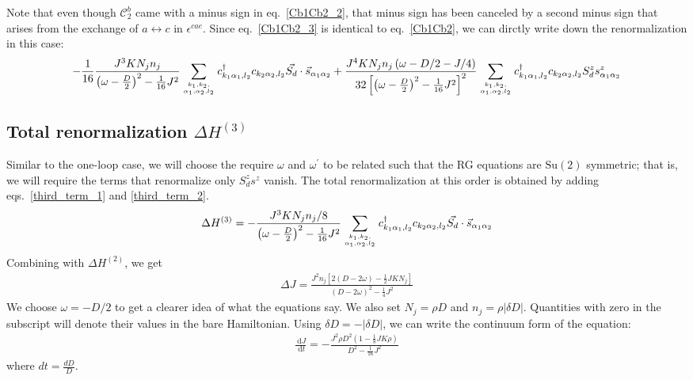 \documentclass{revtex4-2}
\numberwithin{equation}{section}
\begin{document}
Note that even though \(\mathcal{C}^b_2\) came with a minus sign in eq.~\ref{Cb1Cb2_2}, that minus sign has been canceled by a second minus sign that arises from the exchange of \(a \leftrightarrow c\) in \(\epsilon^{cae}\). Since eq.~\ref{Cb1Cb2_3} is identical to eq.~\ref{Cb1Cb2}, we can dirctly write down the renormalization in this case:
\begin{equation}\begin{aligned}
	\label{third_term_2}
	-\frac{1}{16}\frac{J^3 K N_j n_j }{\left(\omega - \frac{D}{2}\right)^2 - \frac{1}{16}J^2}\sum_{k_1,k_2,\atop{\alpha_1,\alpha_2,l_2}}c^\dagger_{k_1\alpha_1,l_2}c_{k_2 \alpha_2,l_2} \vec{S_d}\cdot\vec{s}_{\alpha_1\alpha_2} + \frac{J^4 K N_j n_j \left( \omega - D/2 - J/4 \right) }{32\left[\left(\omega - \frac{D}{2}\right)^2 - \frac{1}{16}J^2\right]^2}\sum_{k_1,k_2,\atop{\alpha_1,\alpha_2,l_2}} c^\dagger_{k_1 \alpha_1,l_2}c_{k_2 \alpha_2,l_2}S_d^z s^z_{\alpha_1\alpha_2}
\end{aligned}\end{equation}

\subsection{Total renormalization \(\Delta H^{(3)}\)}
Similar to the one-loop case, we will choose the require \(\omega\) and \(\omega^\prime\) to be related such that the  RG equations are \(\mathrm{Su}(2)\) symmetric; that is, we will require the terms that renormalize only \(S_d^z s^z\) vanish. The total renormalization at this order is obtained by adding eqs.~\ref{third_term_1} and \ref{third_term_2}.
\begin{equation}\begin{aligned}
	\Delta H^{(3)} = -\frac{J^3 K N_j n_j / 8}{\left(\omega - \frac{D}{2}\right)^2 - \frac{1}{16}J^2}\sum_{k_1,k_2,\atop{\alpha_1,\alpha_2,l_2}}c^\dagger_{k_1\alpha_1,l_2}c_{k_2 \alpha_2,l_2} \vec{S_d}\cdot\vec{s}_{\alpha_1\alpha_2}
\end{aligned}\end{equation}
Combining with \(\Delta H^{(2)}\), we get
\begin{equation}\begin{aligned}
	\Delta J = \frac{J^2 n_j \left[2 \left(D - 2\omega\right) - \frac{1}{2}J K N_j\right]}{\left(D - 2\omega\right)^2 - \frac{1}{4}J^2}
\end{aligned}\end{equation}
We choose \(\omega = -D/2\) to get a clearer idea of what the equations say. We also set \(N_j = \rho D\) and \(n_j = \rho |\delta D|\). Quantities with zero in the subscript will denote their values in the bare Hamiltonian. Using \(\delta D = -|\delta D|\), we can write the continuum form of the equation:
\begin{equation}\begin{aligned}
	\frac{\:\mathrm{d}J}{\:\mathrm{d}t} = -\frac{J^2 \rho D^2 \left(1 - \frac{1}{8}JK\rho\right)}{D^2 - \frac{1}{16}J^2}
\end{aligned}\end{equation}
where \(dt = \frac{dD}{D}\).
\end{document}
